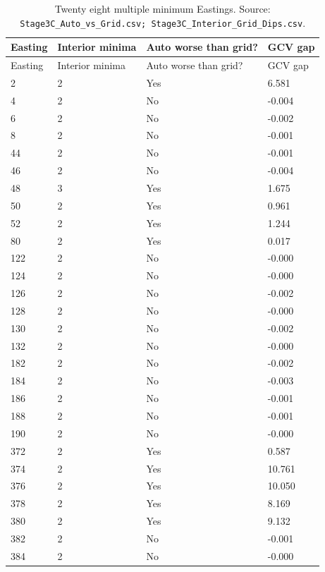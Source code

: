 \begin{longtable}{@{}p{1.8cm}p{3cm}p{4.2cm}p{2.5cm}@{}}
\caption{Twenty eight multiple minimum Eastings. Source: \texttt{Stage3C\_Auto\_vs\_Grid.csv; Stage3C\_Interior\_Grid\_Dips.csv}.}\label{tab:twenty-eight-multiple-minimum-eastings}\\
\toprule
Easting & Interior minima & Auto worse than grid? & GCV gap\\
\midrule
\endfirsthead
\toprule
Easting & Interior minima & Auto worse than grid? & GCV gap\\
\midrule
\endhead
2 & 2 & Yes & 6.581\\
4 & 2 & No & -0.004\\
6 & 2 & No & -0.002\\
8 & 2 & No & -0.001\\
44 & 2 & No & -0.001\\
46 & 2 & No & -0.004\\
48 & 3 & Yes & 1.675\\
50 & 2 & Yes & 0.961\\
52 & 2 & Yes & 1.244\\
80 & 2 & Yes & 0.017\\
122 & 2 & No & -0.000\\
124 & 2 & No & -0.000\\
126 & 2 & No & -0.002\\
128 & 2 & No & -0.000\\
130 & 2 & No & -0.002\\
132 & 2 & No & -0.000\\
182 & 2 & No & -0.002\\
184 & 2 & No & -0.003\\
186 & 2 & No & -0.001\\
188 & 2 & No & -0.001\\
190 & 2 & No & -0.000\\
372 & 2 & Yes & 0.587\\
374 & 2 & Yes & 10.761\\
376 & 2 & Yes & 10.050\\
378 & 2 & Yes & 8.169\\
380 & 2 & Yes & 9.132\\
382 & 2 & No & -0.001\\
384 & 2 & No & -0.000\\
\bottomrule
\end{longtable}
